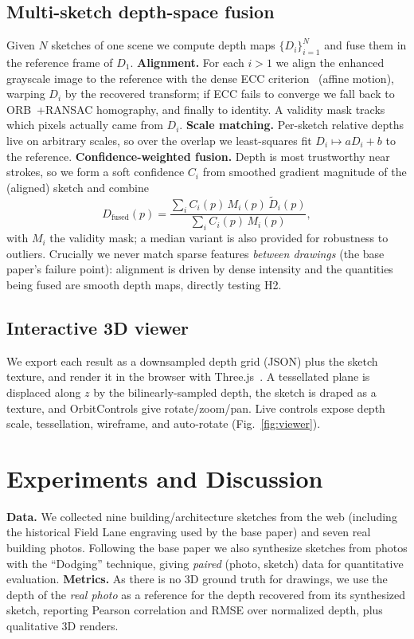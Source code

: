 \documentclass[10pt,twocolumn,letterpaper]{article}
\begin{document}
\subsection{Multi-sketch depth-space fusion}
\label{sec:fuse}
Given $N$ sketches of one scene we compute depth maps
$\{D_i\}_{i=1}^{N}$ and fuse them in the reference frame of $D_1$.
\textbf{Alignment.} For each $i>1$ we align the enhanced grayscale image to
the reference with the dense ECC criterion~\cite{evangelidis2008ecc}
(affine motion), warping $D_i$ by the recovered transform; if ECC fails to
converge we fall back to ORB~\cite{rublee2011orb}+RANSAC homography, and
finally to identity. A validity mask tracks which pixels actually came
from $D_i$. \textbf{Scale matching.} Per-sketch relative depths live on
arbitrary scales, so over the overlap we least-squares fit
$D_i \mapsto a D_i + b$ to the reference. \textbf{Confidence-weighted
fusion.} Depth is most trustworthy near strokes, so we form a soft
confidence $C_i$ from smoothed gradient magnitude of the (aligned) sketch
and combine
\begin{equation}
D_{\text{fused}}(p) = \frac{\sum_i C_i(p)\,M_i(p)\,\tilde D_i(p)}
                            {\sum_i C_i(p)\,M_i(p)},
\end{equation}
with $M_i$ the validity mask; a median variant is also provided for
robustness to outliers. Crucially we never match sparse features
\emph{between drawings} (the base paper's failure point): alignment is
driven by dense intensity and the quantities being fused are smooth depth
maps, directly testing H2.

\subsection{Interactive 3D viewer}
\label{sec:viewer}
We export each result as a downsampled depth grid (JSON) plus the sketch
texture, and render it in the browser with Three.js~\cite{threejs}. A
tessellated plane is displaced along $z$ by the bilinearly-sampled depth,
the sketch is draped as a texture, and OrbitControls give rotate/zoom/pan.
Live controls expose depth scale, tessellation, wireframe, and auto-rotate
(Fig.~\ref{fig:viewer}).

\section{Experiments and Discussion}
\textbf{Data.} We collected nine building/architecture sketches from the web
(including the historical Field Lane engraving used by the base paper) and
seven real building photos. Following the base paper we also synthesize
sketches from photos with the ``Dodging''
technique, giving \emph{paired} (photo, sketch) data for quantitative
evaluation. \textbf{Metrics.} As there is no 3D ground truth for drawings,
we use the depth of the \emph{real photo} as a reference for the depth
recovered from its synthesized sketch, reporting Pearson correlation and
RMSE over normalized depth, plus qualitative 3D renders.
\end{document}

